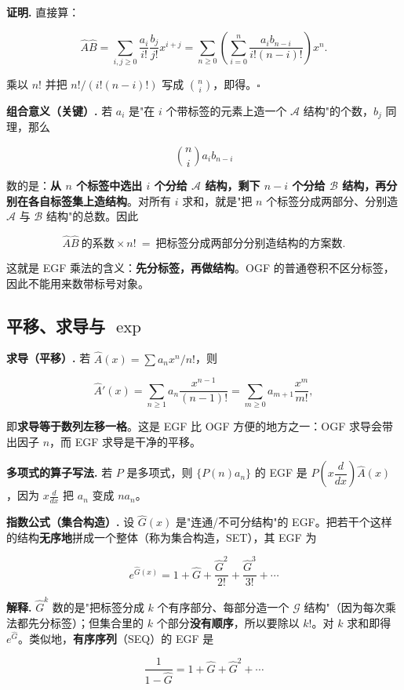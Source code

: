 \textbf{证明.} 直接算：

\[
\hat A\hat B
=\sum_{i,j\ge0}\frac{a_i}{i!}\frac{b_j}{j!}x^{i+j}
=\sum_{n\ge0}\left(\sum_{i=0}^{n}\frac{a_ib_{n-i}}{i!(n-i)!}\right)x^n.
\]

乘以 $n!$ 并把 $n!/(i!(n-i)!)$ 写成 $\binom ni$，即得。$\square$

\textbf{组合意义（关键）.} 若 $a_i$ 是"在 $i$ 个带标签的元素上造一个 $\mathcal A$ 结构"的个数，$b_j$ 同理，那么

\[
\binom ni a_ib_{n-i}
\]

数的是：\textbf{从 $n$ 个标签中选出 $i$ 个分给 $\mathcal A$ 结构，剩下 $n-i$ 个分给 $\mathcal B$ 结构，再分别在各自标签集上造结构}。对所有 $i$ 求和，就是"把 $n$ 个标签分成两部分、分别造 $\mathcal A$ 与 $\mathcal B$ 结构"的总数。因此

\[
\hat A\hat B \ \text{的系数}\times n! \ =\ \text{把标签分成两部分分别造结构的方案数}.
\]

这就是 EGF 乘法的含义：\textbf{先分标签，再做结构}。OGF 的普通卷积不区分标签，因此不能用来数带标号对象。

\subsection{平移、求导与 $\exp$}


\textbf{求导（平移）.} 若 $\hat A(x)=\sum a_nx^n/n!$，则

\[
\hat A'(x)=\sum_{n\ge1}a_n\frac{x^{n-1}}{(n-1)!}=\sum_{m\ge0}a_{m+1}\frac{x^m}{m!},
\]

即\textbf{求导等于数列左移一格}。这是 EGF 比 OGF 方便的地方之一：OGF 求导会带出因子 $n$，而 EGF 求导是干净的平移。

\textbf{多项式的算子写法.} 若 $P$ 是多项式，则 $\{P(n)a_n\}$ 的 EGF 是 $P\!\left(x\dfrac{d}{dx}\right)\hat A(x)$，因为 $x\frac{d}{dx}$ 把 $a_n$ 变成 $n a_n$。

\textbf{指数公式（集合构造）.} 设 $\hat G(x)$ 是"连通/不可分结构"的 EGF。把若干个这样的结构\textbf{无序地}拼成一个整体（称为集合构造，SET），其 EGF 为

\[
e^{\hat G(x)}=1+\hat G+\frac{\hat G^2}{2!}+\frac{\hat G^3}{3!}+\cdots
\]

\textbf{解释.} $\hat G^k$ 数的是"把标签分成 $k$ 个有序部分、每部分造一个 $\mathcal G$ 结构"（因为每次乘法都先分标签）；但集合里的 $k$ 个部分\textbf{没有顺序}，所以要除以 $k!$。对 $k$ 求和即得 $e^{\hat G}$。类似地，\textbf{有序序列}（SEQ）的 EGF 是

\[
\frac{1}{1-\hat G}=1+\hat G+\hat G^2+\cdots
\]

